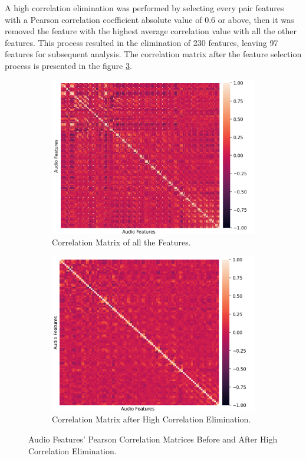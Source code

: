 A high correlation elimination was performed by selecting every pair features with a Pearson correlation coefficient absolute value of 0.6 or above, then it was removed the feature with the highest average correlation value with all the other features. This process resulted in the elimination of 230 features, leaving 97 features for subsequent analysis. The correlation matrix after the feature selection process is presented in the figure \ref{fig:highAudioFeat}.

\begin{figure}
	\centering
	\begin{subfigure}{.5\textwidth}
		\centering
		\includegraphics[width=\linewidth]{figs/4_1_traditional/allCorrMatrix.png}
		\caption{Correlation Matrix of all the Features.}
		\label{fig:allAudioFeat}
	\end{subfigure}%
	\begin{subfigure}{.5\textwidth}
		\centering
		\includegraphics[width=\linewidth]{figs/4_1_traditional/highCorrMatrix.png}
		\caption{Correlation Matrix after High Correlation Elimination.}
		\label{fig:highAudioFeat}
	\end{subfigure}
	\caption{Audio Features' Pearson Correlation Matrices Before and After High Correlation Elimination.}
\end{figure}



